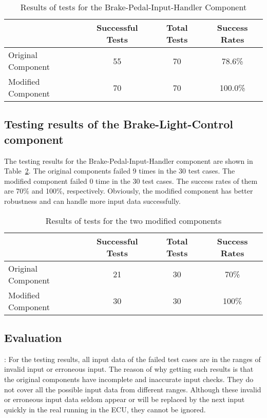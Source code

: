 \begin{table}[htb]
\centering
\begin{tabular}{|p{1.5cm}|c|c|c|}\hline
      & Successful Tests & Total Tests & Success Rates\\ \hline
Original Component & 55 & 70 & 78.6\% \\ \hline
Modified Component & 70 & 70 & 100.0\% \\ \hline
\end{tabular}
\caption{Results of tests for the Brake-Pedal-Input-Handler Component}
\label{tab:resultsTestingOriginalComp}
\vspace{-.6cm}
\end{table}

\subsection{Testing results of the Brake-Light-Control component}\label{sec:resultsModified}

The testing results for the Brake-Pedal-Input-Handler component %
are shown in Table~\ref{tab:resultsTestingModifiedComp}. The original components failed 9 times in the 30 test cases.  The modified component failed 0 time in the 30 test cases. The success rates of them are 70\% and 100\%, respectively. Obviously, the modified component has better robustness and can handle more input data successfully.

\begin{table}[htb]
\centering
\begin{tabular}{|p{1.5cm}|c|c|c|}\hline
      & Successful Tests & Total Tests & Success Rates\\ \hline
Original Component & 21 & 30 & 70\% \\ \hline
Modified Component & 30 & 30 & 100\% \\ \hline
\end{tabular}
\caption{Results of tests for the two modified components}
\label{tab:resultsTestingModifiedComp}
\vspace{-.6cm}
\end{table}

\subsection{Evaluation}\label{sec:evaluations}


: For the testing results, all input data of the failed test cases are in the ranges of invalid input or erroneous input. 
The reason of why getting such results is that the original components have incomplete and inaccurate input checks. They do not cover all the possible input data from different ranges. Although these invalid or erroneous input data seldom appear or will be replaced by the next input quickly in the real running in the ECU, they cannot be ignored. 

